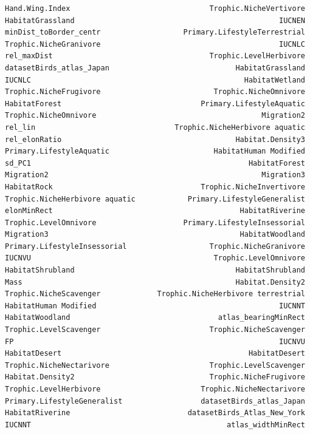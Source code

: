 \documentclass[
  letterpaper,
  DIV=11,
  numbers=noendperiod]{scrreprt}
\begin{document}
\begin{verbatim}
Hand.Wing.Index                                Trophic.NicheVertivore
HabitatGrassland                                               IUCNEN
minDist_toBorder_centr                   Primary.LifestyleTerrestrial
Trophic.NicheGranivore                                         IUCNLC
rel_maxDist                                    Trophic.LevelHerbivore
datasetBirds_atlas_Japan                             HabitatGrassland
IUCNLC                                                 HabitatWetland
Trophic.NicheFrugivore                          Trophic.NicheOmnivore
HabitatForest                                Primary.LifestyleAquatic
Trophic.NicheOmnivore                                      Migration2
rel_lin                                Trophic.NicheHerbivore aquatic
rel_elonRatio                                        Habitat.Density3
Primary.LifestyleAquatic                        HabitatHuman Modified
sd_PC1                                                  HabitatForest
Migration2                                                 Migration3
HabitatRock                                  Trophic.NicheInvertivore
Trophic.NicheHerbivore aquatic            Primary.LifestyleGeneralist
elonMinRect                                           HabitatRiverine
Trophic.LevelOmnivore                    Primary.LifestyleInsessorial
Migration3                                            HabitatWoodland
Primary.LifestyleInsessorial                   Trophic.NicheGranivore
IUCNVU                                          Trophic.LevelOmnivore
HabitatShrubland                                     HabitatShrubland
Mass                                                 Habitat.Density2
Trophic.NicheScavenger             Trophic.NicheHerbivore terrestrial
HabitatHuman Modified                                          IUCNNT
HabitatWoodland                                  atlas_bearingMinRect
Trophic.LevelScavenger                         Trophic.NicheScavenger
FP                                                             IUCNVU
HabitatDesert                                           HabitatDesert
Trophic.NicheNectarivore                       Trophic.LevelScavenger
Habitat.Density2                               Trophic.NicheFrugivore
Trophic.LevelHerbivore                       Trophic.NicheNectarivore
Primary.LifestyleGeneralist                  datasetBirds_atlas_Japan
HabitatRiverine                           datasetBirds_Atlas_New_York
IUCNNT                                             atlas_widthMinRect
\end{verbatim}
\end{document}
